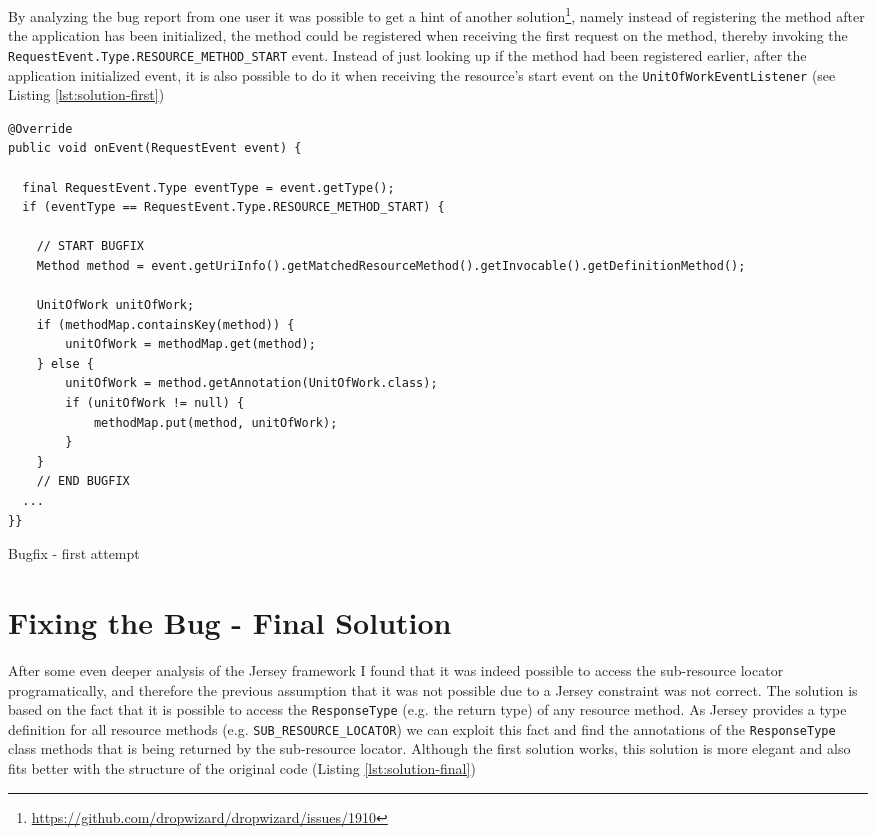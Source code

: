 \documentclass[11pt]{article}
\begin{document}
By analyzing the bug report from one user it was possible to get a hint of another solution\footnote{\url{https://github.com/dropwizard/dropwizard/issues/1910}}, namely instead of registering the method after the application has been initialized, the method could be registered when receiving the first request on the method, thereby invoking the \\ \texttt{RequestEvent.Type.RESOURCE_METHOD_START} event. Instead of just looking up if the method had been registered earlier, after the application initialized event, it is also possible to do it when receiving the resource's start event on the \texttt{UnitOfWorkEventListener} (see Listing \ref{lst:solution-first})

\begin{listing}
\begin{verbatim}
@Override
public void onEvent(RequestEvent event) {

  final RequestEvent.Type eventType = event.getType();
  if (eventType == RequestEvent.Type.RESOURCE_METHOD_START) {

    // START BUGFIX
    Method method = event.getUriInfo().getMatchedResourceMethod().getInvocable().getDefinitionMethod();

    UnitOfWork unitOfWork;
    if (methodMap.containsKey(method)) {
        unitOfWork = methodMap.get(method);
    } else {
        unitOfWork = method.getAnnotation(UnitOfWork.class);
        if (unitOfWork != null) {
            methodMap.put(method, unitOfWork);
        }
    }
    // END BUGFIX
  ...
}}
\end{verbatim}
\caption{Bugfix - first attempt}
\label{lst:solution-first}
\end{listing}

\section{Fixing the Bug - Final Solution}

After some even deeper analysis of the Jersey framework I found that it was indeed possible to access the sub-resource locator programatically, and therefore the previous assumption that it was not possible due to a Jersey constraint was not correct. The solution is based on the fact that it is possible to access the \texttt{ResponseType} (e.g. the return type) of any resource method. As Jersey provides a type definition for all resource methods (e.g. \texttt{SUB_RESOURCE_LOCATOR}) we can exploit this fact and find the annotations of the \texttt{ResponseType} class methods that is being returned by the sub-resource locator. Although the first solution works, this solution is more elegant and also fits better with the structure of the original code (Listing \ref{lst:solution-final})
\end{document}
